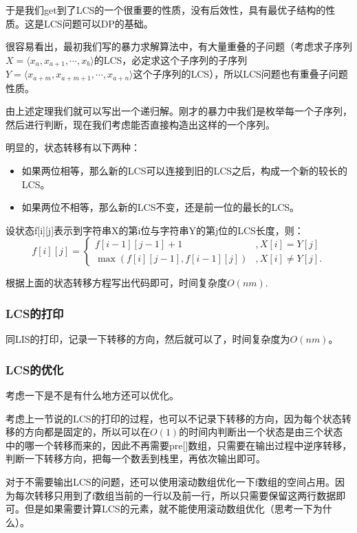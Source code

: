 \documentclass{article}
\theoremstyle{nonumberplain}
\begin{document}
于是我们get到了LCS的一个很重要的性质，没有后效性，具有最优子结构的性质。这是LCS问题可以DP的基础。

很容易看出，最初我们写的暴力求解算法中，有大量重叠的子问题（考虑求子序列$X = \langle x_a, x_{a+1}, \cdots, x_b\rangle$的LCS，必定求这个子序列的子序列$Y = \langle x_{a+m}, x_{a+m+1}, \cdots, x_{a+n}\rangle$这个子序列的LCS），所以LCS问题也有重叠子问题性质。

由上述定理我们就可以写出一个递归解。刚才的暴力中我们是枚举每一个子序列，然后进行判断，现在我们考虑能否直接构造出这样的一个序列。

明显的，状态转移有以下两种：
\begin{itemize}
	\item{如果两位相等，那么新的LCS可以连接到旧的LCS之后，构成一个新的较长的LCS。}
	\item{如果两位不相等，那么新的LCS不变，还是前一位的最长的LCS。}
\end{itemize}
设状态f[i][j]表示到字符串X的第i位与字符串Y的第j位的LCS长度，则：
\begin{equation*}
	f[i][j]=\begin{cases}
		f[i-1][j-1]+1             & , X[i]=Y[j]     \\
		\max(f[i][j-1],f[i-1][j]) & , X[i]\neq Y[j].
	\end{cases}
\end{equation*}

根据上面的状态转移方程写出代码即可，时间复杂度$O(nm)$.
\subsubsection{LCS的打印}
同LIS的打印，记录一下转移的方向，然后就可以了，时间复杂度为$O(nm)$。
\subsubsection{LCS的优化}
考虑一下是不是有什么地方还可以优化。

考虑上一节说的LCS的打印的过程，也可以不记录下转移的方向，因为每个状态转移的方向都是固定的，所以可以在$O(1)$的时间内判断出一个状态是由三个状态中的哪一个转移而来的，因此不再需要pre[]数组，只需要在输出过程中逆序转移，判断一下转移方向，把每一个数丢到栈里，再依次输出即可。

对于不需要输出LCS的问题，还可以使用滚动数组优化一下f数组的空间占用。因为每次转移只用到了f数组当前的一行以及前一行，所以只需要保留这两行数据即可。但是如果需要计算LCS的元素，就不能使用滚动数组优化（思考一下为什么）。
\end{document}
